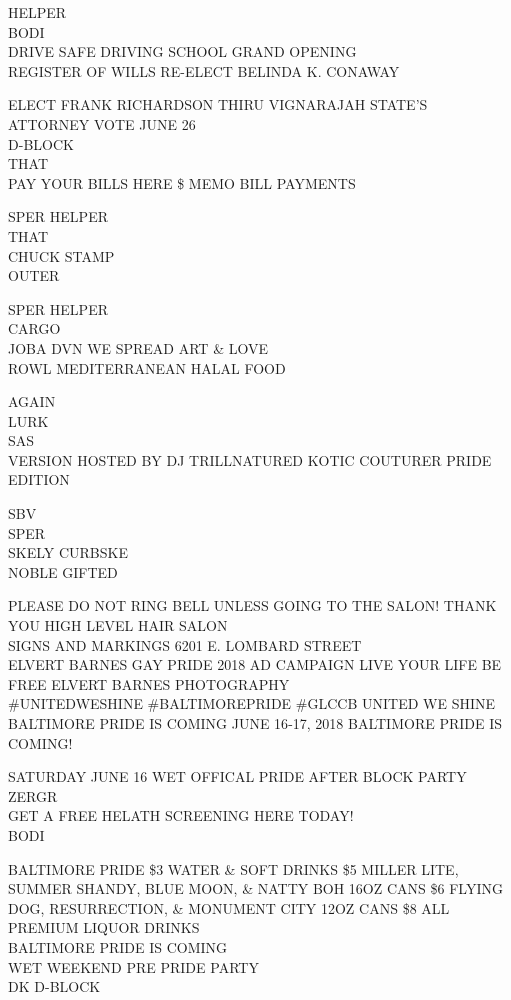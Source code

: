 \documentclass[10pt,letterpaper]{article}
\begin{document}
HELPER\\
BODI\\
DRIVE SAFE DRIVING SCHOOL GRAND OPENING\\
REGISTER OF WILLS RE{-}ELECT BELINDA K. CONAWAY

ELECT FRANK RICHARDSON THIRU VIGNARAJAH STATE'S ATTORNEY VOTE JUNE 26\\
D{-}BLOCK\\
THAT\\
PAY YOUR BILLS HERE \$ MEMO BILL PAYMENTS

SPER HELPER\\
THAT\\
CHUCK STAMP\\
OUTER

SPER HELPER\\
CARGO\\
JOBA DVN WE SPREAD ART \& LOVE\\
ROWL MEDITERRANEAN HALAL FOOD

AGAIN\\
LURK\\
SAS\\
VERSION HOSTED BY DJ TRILLNATURED KOTIC COUTURER PRIDE EDITION

SBV\\
SPER\\
SKELY CURBSKE\\
NOBLE GIFTED

PLEASE DO NOT RING BELL UNLESS GOING TO THE SALON!  THANK YOU  HIGH LEVEL HAIR SALON\\
SIGNS AND MARKINGS 6201 E. LOMBARD STREET\\
ELVERT BARNES GAY PRIDE 2018 AD CAMPAIGN LIVE YOUR LIFE BE FREE ELVERT BARNES PHOTOGRAPHY\\
\#UNITEDWESHINE \#BALTIMOREPRIDE \#GLCCB UNITED WE SHINE BALTIMORE PRIDE IS COMING JUNE 16{-}17, 2018 BALTIMORE PRIDE IS COMING!

SATURDAY JUNE 16 WET OFFICAL PRIDE AFTER BLOCK PARTY\\
ZERGR\\
GET A FREE HELATH SCREENING HERE TODAY!\\
BODI

BALTIMORE PRIDE \$3 WATER \& SOFT DRINKS \$5 MILLER LITE, SUMMER SHANDY, BLUE MOON, \& NATTY BOH 16OZ CANS \$6 FLYING DOG, RESURRECTION, \& MONUMENT CITY 12OZ CANS \$8 ALL PREMIUM LIQUOR DRINKS\\
BALTIMORE PRIDE IS COMING\\
WET WEEKEND PRE PRIDE PARTY\\
DK D{-}BLOCK
\end{document}
